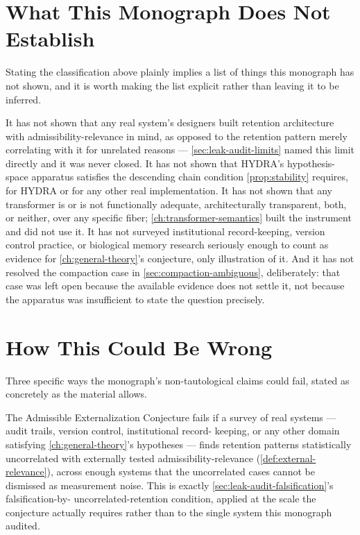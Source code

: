 \documentclass[11pt]{book}
\theoremstyle{plain}
\theoremstyle{definition}
\theoremstyle{remark}
\begin{document}
\section{What This Monograph Does Not Establish}

Stating the classification above plainly implies a list of things this
monograph has not shown, and it is worth making the list explicit
rather than leaving it to be inferred.

It has not shown that any real system's designers built retention
architecture with admissibility-relevance in mind, as opposed to the
retention pattern merely correlating with it for unrelated reasons ---
\cref{sec:leak-audit-limits} named this limit directly and it was
never closed. It has not shown that HYDRA's hypothesis-space apparatus
satisfies the descending chain condition \cref{prop:stability}
requires, for HYDRA or for any other real implementation. It has not
shown that any transformer is or is not functionally adequate,
architecturally transparent, both, or neither, over any specific
fiber; \cref{ch:transformer-semantics} built the instrument and did
not use it. It has not surveyed institutional record-keeping, version
control practice, or biological memory research seriously enough to
count as evidence for \cref{ch:general-theory}'s conjecture, only
illustration of it. And it has not resolved the compaction case in
\cref{sec:compaction-ambiguous}, deliberately: that case was left open
because the available evidence does not settle it, not because the
apparatus was insufficient to state the question precisely.

\section{How This Could Be Wrong}

Three specific ways the monograph's non-tautological claims could
fail, stated as concretely as the material allows.

The Admissible Externalization Conjecture fails if a survey of real
systems --- audit trails, version control, institutional record-
keeping, or any other domain satisfying \cref{ch:general-theory}'s
hypotheses --- finds retention patterns statistically uncorrelated
with externally tested admissibility-relevance
(\cref{def:external-relevance}), across enough systems that the
uncorrelated cases cannot be dismissed as measurement noise. This is
exactly \cref{sec:leak-audit-falsification}'s falsification-by-
uncorrelated-retention condition, applied at the scale the conjecture
actually requires rather than to the single system this monograph
audited.
\end{document}
